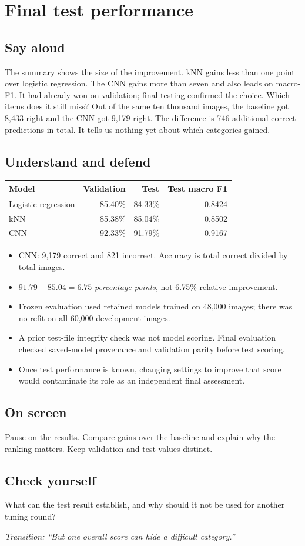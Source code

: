 \documentclass[11pt,a4paper]{article}
\newcommand{\slide}[3]{\clearpage{\small\color{olive}SLIDE #1\hfill Target: #3}\par\section{#2}}
\newcommand{\say}{\subsection{Say aloud}}
\newcommand{\understand}{\subsection{Understand and defend}}
\newcommand{\screen}{\subsection{On screen}}
\newcommand{\selfcheck}[1]{\subsection{Check yourself}#1}
\newcommand{\transition}[1]{\par\smallskip\textit{Transition: #1}}
\begin{document}
\slide{11}{Final test performance}{35 seconds}
\say
The summary shows the size of the improvement. kNN gains less than one point over logistic regression. The CNN gains more than seven and also leads on macro-F1. It had already won on validation; final testing confirmed the choice. Which items does it still miss? Out of the same ten thousand images, the baseline got 8,433 right and the CNN got 9,179 right. The difference is 746 additional correct predictions in total. It tells us nothing yet about which categories gained.
\understand
\begin{tabularx}{\linewidth}{Xrrr}
\toprule Model & Validation & Test & Test macro F1\\\midrule
Logistic regression & 85.40\% & 84.33\% & 0.8424\\
kNN & 85.38\% & 85.04\% & 0.8502\\
CNN & 92.33\% & 91.79\% & 0.9167\\\bottomrule
\end{tabularx}
\begin{itemize}
\item CNN: 9,179 correct and 821 incorrect. Accuracy is total correct divided by total images.
\item $91.79-85.04=6.75$ \emph{percentage points}, not 6.75\% relative improvement.
\item Frozen evaluation used retained models trained on 48,000 images; there was no refit on all 60,000 development images.
\item A prior test-file integrity check was not model scoring. Final evaluation checked saved-model provenance and validation parity before test scoring.
\item Once test performance is known, changing settings to improve that score would contaminate its role as an independent final assessment.
\end{itemize}
\screen
Pause on the results. Compare gains over the baseline and explain why the ranking matters. Keep validation and test values distinct.
\selfcheck{What can the test result establish, and why should it not be used for another tuning round?}
\transition{``But one overall score can hide a difficult category.''}
\end{document}

